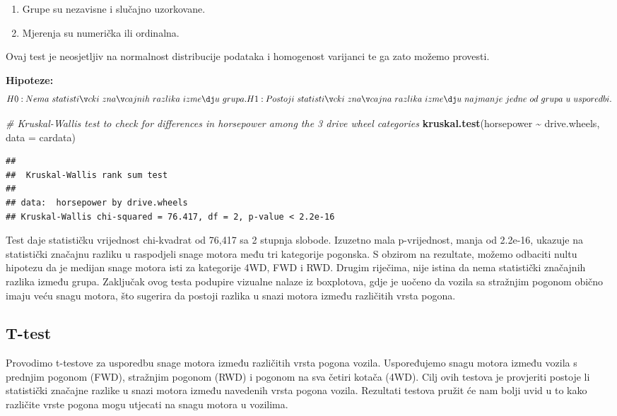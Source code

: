\documentclass[
]{article}
\newenvironment{Shaded}{\begin{snugshade}}{\end{snugshade}}
\newcommand{\AttributeTok}[1]{\textcolor[rgb]{0.13,0.29,0.53}{#1}}
\newcommand{\CommentTok}[1]{\textcolor[rgb]{0.56,0.35,0.01}{\textit{#1}}}
\newcommand{\FunctionTok}[1]{\textcolor[rgb]{0.13,0.29,0.53}{\textbf{#1}}}
\newcommand{\NormalTok}[1]{#1}
\newcommand{\SpecialCharTok}[1]{\textcolor[rgb]{0.81,0.36,0.00}{\textbf{#1}}}
\providecommand{\tightlist}{%
  \setlength{\itemsep}{0pt}\setlength{\parskip}{0pt}}
\begin{document}
\begin{enumerate}
\def\labelenumi{\arabic{enumi}.}
\tightlist
\item
  Grupe su nezavisne i slučajno uzorkovane.
\item
  Mjerenja su numerička ili ordinalna.
\end{enumerate}

Ovaj test je neosjetljiv na normalnost distribucije podataka i
homogenost varijanci te ga zato možemo provesti.

\textbf{Hipoteze:}
\[H0: Nema\ statistički\ značajnih\ razlika\ između\ grupa.\\H1: Postoji\ statistički\ značajna\ razlika\ između\ najmanje\ jedne\ od\ grupa\ u\ usporedbi.\]

\begin{Shaded}
\begin{Highlighting}[]
\CommentTok{\# Kruskal{-}Wallis test to check for differences in \textquotesingle{}horsepower\textquotesingle{} among the 3 drive wheel categories}
\FunctionTok{kruskal.test}\NormalTok{(horsepower }\SpecialCharTok{\textasciitilde{}}\NormalTok{ drive.wheels, }\AttributeTok{data =}\NormalTok{ cardata)}
\end{Highlighting}
\end{Shaded}

\begin{verbatim}
## 
##  Kruskal-Wallis rank sum test
## 
## data:  horsepower by drive.wheels
## Kruskal-Wallis chi-squared = 76.417, df = 2, p-value < 2.2e-16
\end{verbatim}

Test daje statističku vrijednost chi-kvadrat od 76,417 sa 2 stupnja
slobode. Izuzetno mala p-vrijednost, manja od 2.2e-16, ukazuje na
statistički značajnu razliku u raspodjeli snage motora među tri
kategorije pogonska. S obzirom na rezultate, možemo odbaciti nultu
hipotezu da je medijan snage motora isti za kategorije 4WD, FWD i RWD.
Drugim riječima, nije istina da nema statistički značajnih razlika
između grupa. Zaključak ovog testa podupire vizualne nalaze iz
boxplotova, gdje je uočeno da vozila sa stražnjim pogonom obično imaju
veću snagu motora, što sugerira da postoji razlika u snazi motora između
različitih vrsta pogona.

\subsection{T-test}\label{t-test}

Provodimo t-testove za usporedbu snage motora između različitih vrsta
pogona vozila. Uspoređujemo snagu motora između vozila s prednjim
pogonom (FWD), stražnjim pogonom (RWD) i pogonom na sva četiri kotača
(4WD). Cilj ovih testova je provjeriti postoje li statistički značajne
razlike u snazi motora između navedenih vrsta pogona vozila. Rezultati
testova pružit će nam bolji uvid u to kako različite vrste pogona mogu
utjecati na snagu motora u vozilima.
\end{document}
